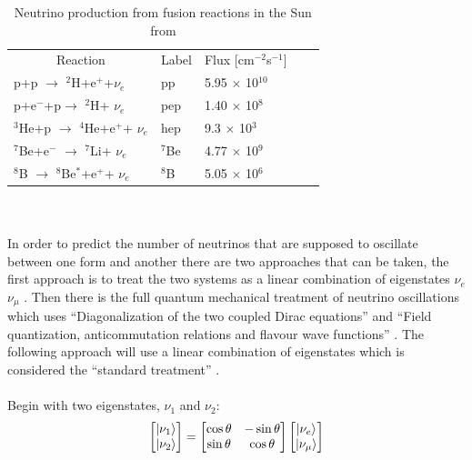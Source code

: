 \begin{table}
\centering
\begin{tabular}{lllll}  
\toprule
\multicolumn{1}{c}{Reaction} & \multicolumn{1}{c}{Label} & \multicolumn{1}{c}{Flux [cm$^{-2}$s$^{-1}$]}
\\
\cmidrule(r){1-1}
\cmidrule(r){2-2}
\cmidrule(r){3-3}
p+p $\rightarrow$ $^2$H+e$^+$+$\nu_e$           & pp                & 5.95 $\times$ 10$^{10}$\\
p+e$^-$+p$\rightarrow$ $^2$H+ $\nu_e$           & pep               & 1.40 $\times$ 10$^{8}$\\
$^3$He+p $\rightarrow$ $^4$He+e$^+$+ $\nu_e$     & hep               & 9.3  $\times$ 10$^{3}$\\
$^7$Be+e$^-$ $\rightarrow$ $^7$Li+ $\nu_e$       & $^7$Be            & 4.77 $\times$ 10$^{9}$\\
$^8$B $\rightarrow$ $^8$Be$^*$+e$^+$+ $\nu_e$   & $^8$B             & 5.05 $\times$ 10$^{6}$\\
\bottomrule   
\end{tabular}
\caption{Neutrino production from fusion reactions in the Sun from \cite{Bellerive:2003rj} }
\label{solar_nuetrino_table}
\end{table}
\\\\In order to predict the number of neutrinos that are supposed to oscillate between one form and another there are two approaches that can be taken, the first approach is to treat the two systems as a linear combination of eigenstates $\nu_e$ $\nu_\mu$ \cite{griffiths2008book}\cite{griffiths2008neutrinoOscillations} \cite{sassaroli1999neutrino}. Then there is the full quantum mechanical treatment of neutrino oscillations which uses ``Diagonalization of the two coupled Dirac equations'' and ``Field quantization, anticommutation relations and flavour wave functions'' \cite{sassaroli1999neutrino}. The following approach will use a linear combination of eigenstates which is considered the ``standard treatment'' \cite{sassaroli1999neutrino} \cite{griffiths2008book} \cite{griffiths2008neutrinoOscillations}.
\\\\Begin with two eigenstates, $\nu_1$ and $\nu_2$: 
\begin{equation}
    \begin{bmatrix}
        \ket{\nu_1} \\
        \ket{\nu_2}
    \end{bmatrix}
    =
    \begin{bmatrix}
        \cos\theta & -\sin\theta \\
        \sin\theta & \cos\theta 
    \end{bmatrix}
        \begin{bmatrix}
        \ket{\nu_e} \\
        \ket{\nu_\mu}
    \end{bmatrix}
    \label{linear_combination_eq_1}
\end{equation}
